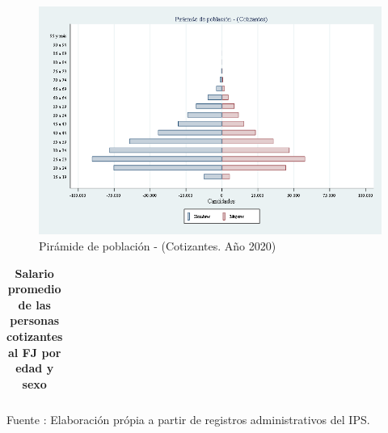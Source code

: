 \begin{figure}[H]
\begin{center}
                    \caption{Pirámide de población - (Cotizantes. Año 2020)}
                    \vspace{0.5cm}
                    \includegraphics[scale=0.6]{RA_IPS_cotizantes_2020_sexo_edadt_piramide.png}
\end{center}
\end{figure}

\begin{table}[H]
\begin{center}
\scriptsize
\caption{\bf{Salario promedio de las personas cotizantes al FJ por edad y sexo}}
\begin{tabular}{l|rrrrrrrrrrrrr}

\end{tabular}
                    \item Fuente : Elaboración própia a partir de registros administrativos del IPS.
\end{center}
\end{table}

